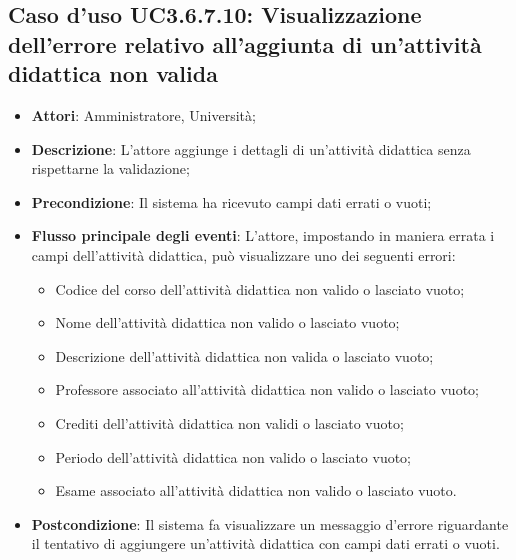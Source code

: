 \subsection{Caso d'uso \texorpdfstring{UC3.6.7.10}{UC3.6.7.10}: Visualizzazione dell'errore relativo all’aggiunta di un’attività didattica non valida}
\begin{itemize}
	\item \textbf{Attori}: Amministratore, Università;
	\item \textbf{Descrizione}: L'attore aggiunge i dettagli di un’attività didattica senza rispettarne la validazione;
	
	\item \textbf{Precondizione}: Il sistema ha ricevuto campi dati errati o vuoti;
	
	\item \textbf{Flusso principale degli eventi}: L'attore, impostando in maniera errata i campi dell’attività didattica, può visualizzare uno dei seguenti errori:
	\begin{itemize}
		\item Codice del corso dell’attività didattica non valido o lasciato vuoto;
		\item Nome dell’attività didattica non valido o lasciato vuoto;
		\item Descrizione dell’attività didattica non valida o lasciato vuoto;
		\item Professore associato all’attività didattica non valido o lasciato vuoto;
		\item Crediti dell’attività didattica non validi o lasciato vuoto;
		\item Periodo dell’attività didattica non valido o lasciato vuoto;
		\item Esame associato all’attività didattica non valido o lasciato vuoto.
	\end{itemize}
	\item \textbf{Postcondizione}: Il sistema fa visualizzare un messaggio d'errore riguardante il tentativo di aggiungere un'attività didattica con campi dati errati o vuoti.
	
\end{itemize}
